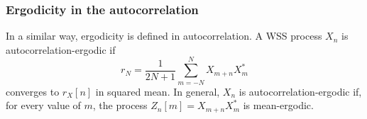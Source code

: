 \subsubsection{Ergodicity in the autocorrelation}

In a similar way, ergodicity is defined in autocorrelation. A WSS process $X_n$ is autocorrelation-ergodic if
\begin{equation}
\label{ec:autocorr_ergodic}
r_N = \frac{1}{2N+1}\sum_{m=-N}^{N} X_{m+n} X_m^*
\end{equation}
converges to $r_X[n]$ in squared mean. In general, $X_n$ is autocorrelation-ergodic if, for every value of $m$, the process $Z_n[m] = X_{m + n} X_m^*$ is mean-ergodic.





%
%
%

